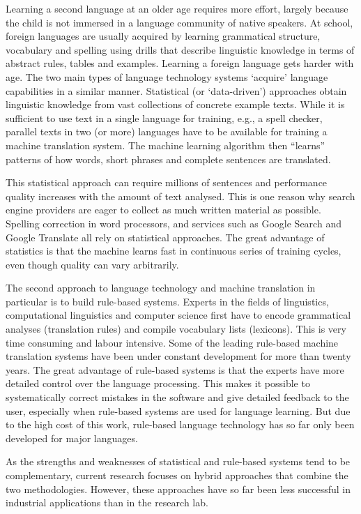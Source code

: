 \documentclass{../../metanetpaper}
\begin{document}
\begin{Parallel}[c]{79mm}{78mm}
{Learning a second language at an older age requires more effort, largely
because the child is not immersed in a language community of native speakers.
At school, foreign languages are usually acquired by learning grammatical
structure, vocabulary and spelling using drills that describe linguistic
knowledge in terms of abstract rules, tables and examples. Learning a foreign
language gets harder with age.
The two main types of language technology systems ‘acquire’ language
capabilities in a similar manner. Statistical (or ‘data-driven’) approaches
obtain linguistic knowledge from vast collections of concrete example texts.
While it is sufficient to use text in a single language for training, e.g., a
spell checker, parallel texts in two (or more) languages have to be available
for training a machine translation system. The machine learning algorithm then
“learns” patterns of how words, short phrases and complete sentences are
translated.

This statistical approach can require millions of sentences and performance
quality increases with the amount of text analysed. This is one reason why
search engine providers are eager to collect as much written material as
possible. Spelling correction in word processors, and services such as Google
Search and Google Translate all rely on statistical approaches. The great
advantage of statistics is that the machine learns fast in continuous series of
training cycles, even though quality can vary arbitrarily.

The second approach to language technology and machine translation in
particular is to build rule-based systems. Experts in the fields of
linguistics, computational linguistics and computer science first have to
encode grammatical analyses (translation rules) and compile vocabulary lists
(lexicons). This is very time consuming and labour intensive. Some of the
leading rule-based machine translation systems have been under constant
development for more than twenty years. The great advantage of rule-based
systems is that the experts have more detailed control over the language
processing. This makes it possible to systematically correct mistakes in the
software and give detailed feedback to the user, especially when rule-based
systems are used for language learning. But due to the high cost of this work,
rule-based language technology has so far only been developed for major
languages.

As the strengths and weaknesses of statistical and rule-based systems tend to
be complementary, current research focuses on hybrid approaches that combine
the two methodologies. However, these approaches have so far been less
successful in industrial applications than in the research lab.

}
\end{Parallel}
\end{document}
